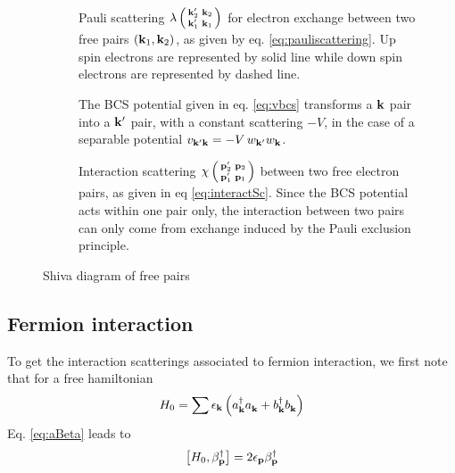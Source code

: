 \documentclass[aps,prb,amsmath,amssymb,preprint,superscriptaddress]{revtex4-1}
\begin{document}
\begin{figure}[htb]
 \centering

 \qquad
{}\\
 \caption{Shiva diagram of free pairs }


 \begin{description}
 
 \item[] Pauli scattering $\lambda\left(\begin{smallmatrix}\mathbf{k}'_2&\mathbf{k}_2\\\mathbf{k}'_1&\mathbf{k}_1\end{smallmatrix}\right)$ for electron exchange between two free pairs $\left(\mathbf{k}_1,\mathbf{k}_2\right)$, as given by eq. \eqref{eq:pauliscattering}. Up spin electrons are represented by solid line while down spin electrons are represented by dashed line.
 \item[] The BCS potential given in eq. \eqref{eq:vbcs} transforms a $\mathbf{k}$ pair into a $\mathbf{k}'$ pair, with a constant scattering $-V$, in the case of a separable potential $v_{\mathbf{k}'\mathbf{k}}=-V\,w_{\mathbf{k}'}w_{\mathbf{k}}$. 
 
 \item[] Interaction scattering  $\chi\left(\begin{smallmatrix}\mathbf{p}'_2&\mathbf{p}_2\\\mathbf{p}'_1&\mathbf{p}_1\end{smallmatrix}\right)$ between two free electron pairs, as given in eq \eqref{eq:interactSc}. Since the BCS potential acts within one pair only, the interaction between two pairs can only come from exchange induced by the Pauli exclusion principle.
 \end{description} 


 \end{figure}
\subsection{Fermion interaction}
To get the interaction scatterings associated to fermion interaction, we first note that for a free hamiltonian
\begin{equation}\label{eq:h0}
H_0=\sum{\epsilon_{\ensuremath{\mathbf{k}}}\ensuremath{\left(a^{\dagger}_{\mathbf{k}} a^{}_{\mathbf{k}}+b^{\dagger}_{\mathbf{k}} b^{}_{\mathbf{k}}\right)}}
\end{equation}
Eq. \eqref{eq:aBeta} leads to 
\begin{equation}\label{eq:betaH}
\left[H_0,\beta^{\dagger}_{\mathbf{p}}\right]=2\epsilon_{\mathbf{p}}\beta^{\dagger}_{\mathbf{p}}
\end{equation}
\end{document}
